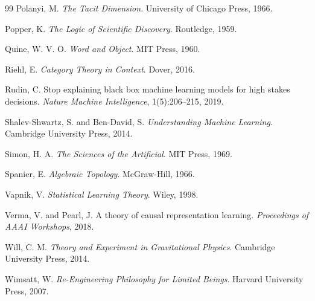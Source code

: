 \documentclass[12pt,oneside]{book}
\theoremstyle{plain}
\theoremstyle{definition}
\theoremstyle{remark}
\newcommand{\1}{\mathbf{1}}
\begin{document}
\begin{thebibliography}{99}
Polanyi, M.
\textit{The Tacit Dimension}.
University of Chicago Press, 1966.

Popper, K.
\textit{The Logic of Scientific Discovery}.
Routledge, 1959.

Quine, W. V. O.
\textit{Word and Object}.
MIT Press, 1960.

Riehl, E.
\textit{Category Theory in Context}.
Dover, 2016.

Rudin, C.
Stop explaining black box machine learning models for high stakes decisions.
\textit{Nature Machine Intelligence}, 1(5):206--215, 2019.

Shalev-Shwartz, S. and Ben-David, S.
\textit{Understanding Machine Learning}.
Cambridge University Press, 2014.

Simon, H. A.
\textit{The Sciences of the Artificial}.
MIT Press, 1969.

Spanier, E.
\textit{Algebraic Topology}.
McGraw-Hill, 1966.

Vapnik, V.
\textit{Statistical Learning Theory}.
Wiley, 1998.

Verma, V. and Pearl, J.
A theory of causal representation learning.
\textit{Proceedings of AAAI Workshops}, 2018.

Will, C. M.
\textit{Theory and Experiment in Gravitational Physics}.
Cambridge University Press, 2014.

Wimsatt, W.
\textit{Re-Engineering Philosophy for Limited Beings}.
Harvard University Press, 2007.

\end{thebibliography}
\end{document}
